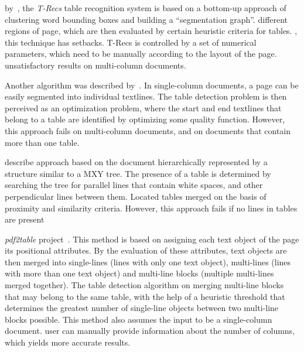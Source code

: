  by~\citet{TRecs}, the \emph{T-Recs} table recognition system is based on a bottom-up approach of clustering word bounding boxes and building a ``segmentation graph''.  different regions of page, which are then evaluated by certain heuristic criteria for tables. , this technique has  setbacks. T-Recs is controlled by a set of numerical parameters, which need to be  manually according to the layout of the page.  unsatisfactory results on multi-column documents.

Another algorithm was described by~\citet{MediumTable}. In single-column documents, a page can be easily segmented into individual textlines. The table detection problem is then perceived as an optimization problem, where the start and end textlines that belong to a table are identified by optimizing some quality function. However, this approach fails on multi-column documents, and on documents that contain more than one table.

\citet{tableDetectCesarini} describe  approach based on the document  hierarchically represented by a structure similar to a MXY tree. The presence of a table is determined by searching the tree for parallel lines that contain white spaces, and other perpendicular lines between them. Located tables  merged on the basis of proximity and similarity criteria. However, this approach fails if no lines in tables are present

\emph{pdf2table} project~\cite{pdf2table}. This method is based on assigning each text object of the page its positional attributes. By the evaluation of these attributes, text objects are then merged into single-lines (lines with only one text object), multi-lines (lines with more than one text object) and multi-line blocks (multiple multi-lines merged together). The table detection algorithm  on merging  multi-line blocks that may belong to the same table, with the help of a heuristic threshold that determines the greatest number of single-line objects between two multi-line blocks possible. This method also assumes the input to be a single-column document.  user can manually provide  information about the number of columns, which yields more accurate results.

